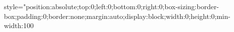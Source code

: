 style="position:absolute;top:0;left:0;bottom:0;right:0;box-sizing:border-box;padding:0;border:none;margin:auto;display:block;width:0;height:0;min-width:100%